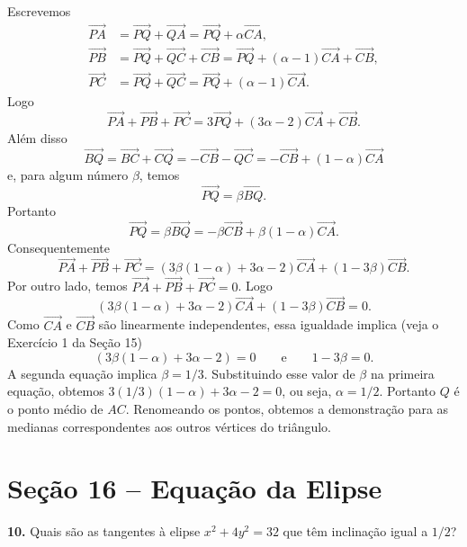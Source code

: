 \documentclass[a4paper,11pt]{article}
\begin{document}
Escrevemos
\begin{align*}
  \overrightarrow{PA} & = \overrightarrow{PQ} + \overrightarrow{QA} = \overrightarrow{PQ} + \alpha \overrightarrow{CA}, \\
  \overrightarrow{PB} & = \overrightarrow{PQ} + \overrightarrow{QC} + \overrightarrow{CB} = \overrightarrow{PQ} + (\alpha - 1) \overrightarrow{CA} + \overrightarrow{CB}, \\
  \overrightarrow{PC} & = \overrightarrow{PQ} + \overrightarrow{QC} = \overrightarrow{PQ} + (\alpha - 1) \overrightarrow{CA}.
\end{align*}
Logo
\[
  \overrightarrow{PA} + \overrightarrow{PB} + \overrightarrow{PC} = 3 \overrightarrow{PQ} + (3\alpha - 2) \overrightarrow{CA} + \overrightarrow{CB}.
\]
Além disso
\[
  \overrightarrow{BQ} = \overrightarrow{BC} + \overrightarrow{CQ} = - \overrightarrow{CB} - \overrightarrow{QC} = - \overrightarrow{CB} + (1 - \alpha) \overrightarrow{CA}
\]
e, para algum número $\beta$, temos
\[
  \overrightarrow{PQ} = \beta \overrightarrow{BQ}.
\]
Portanto
\[
  \overrightarrow{PQ} = \beta \overrightarrow{BQ} = - \beta \overrightarrow{CB} + \beta (1 - \alpha) \overrightarrow{CA}.
\]
Consequentemente
\[
  \overrightarrow{PA} + \overrightarrow{PB} + \overrightarrow{PC} = (3 \beta (1 - \alpha) + 3\alpha - 2) \overrightarrow{CA} + (1 - 3 \beta) \overrightarrow{CB}.
\]
Por outro lado, temos $\overrightarrow{PA} + \overrightarrow{PB} + \overrightarrow{PC} = 0$.
Logo
\[
  (3 \beta (1 - \alpha) + 3\alpha - 2) \overrightarrow{CA} + (1 - 3 \beta) \overrightarrow{CB} = 0.
\]
Como $\overrightarrow{CA}$ e $\overrightarrow{CB}$ são linearmente independentes, essa igualdade implica
(veja o Exercício 1 da Seção 15)
\[
  (3 \beta(1 - \alpha) + 3\alpha - 2) = 0 \qquad \text{e} \qquad 1 - 3 \beta = 0.
\]
A segunda equação implica $\beta = 1/3$.
Substituindo esse valor de $\beta$ na primeira equação, obtemos $3(1/3)(1 - \alpha) + 3\alpha - 2 = 0$, ou seja, $\alpha = 1/2$.
Portanto $Q$ é o ponto médio de $AC$.
Renomeando os pontos, obtemos a demonstração para as medianas correspondentes aos outros vértices do triângulo.

\section*{Seção 16 -- Equação da Elipse}

\textbf{10.}
Quais são as tangentes à elipse $x^2 + 4y^2 = 32$ que têm inclinação igual a $1/2$?

\vspace{\baselineskip}
\end{document}
